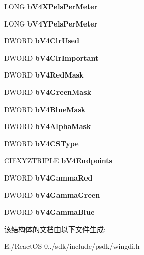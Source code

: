 \begin{DoxyCompactItemize}
L\+O\+NG {\bfseries b\+V4\+X\+Pels\+Per\+Meter}
\item 
\mbox{\label{struct_b_i_t_m_a_p_v4_h_e_a_d_e_r_a0fc6a8bfef13b3f5e3bb1db83ecb7c46}} 
L\+O\+NG {\bfseries b\+V4\+Y\+Pels\+Per\+Meter}
\item 
\mbox{\label{struct_b_i_t_m_a_p_v4_h_e_a_d_e_r_a67d48337562bfccf0e7bfad5e43259f5}} 
D\+W\+O\+RD {\bfseries b\+V4\+Clr\+Used}
\item 
\mbox{\label{struct_b_i_t_m_a_p_v4_h_e_a_d_e_r_a21566ebf9fc5970062c26f306de07291}} 
D\+W\+O\+RD {\bfseries b\+V4\+Clr\+Important}
\item 
\mbox{\label{struct_b_i_t_m_a_p_v4_h_e_a_d_e_r_abf265e26d79ff724cadb96afc1705c75}} 
D\+W\+O\+RD {\bfseries b\+V4\+Red\+Mask}
\item 
\mbox{\label{struct_b_i_t_m_a_p_v4_h_e_a_d_e_r_a565665e5c6929465d6bcddb801624435}} 
D\+W\+O\+RD {\bfseries b\+V4\+Green\+Mask}
\item 
\mbox{\label{struct_b_i_t_m_a_p_v4_h_e_a_d_e_r_aef5549b5b6d4a9cf64f2d9073148f6ff}} 
D\+W\+O\+RD {\bfseries b\+V4\+Blue\+Mask}
\item 
\mbox{\label{struct_b_i_t_m_a_p_v4_h_e_a_d_e_r_a83b08e6edd1fffae8c578bcfe5aedb16}} 
D\+W\+O\+RD {\bfseries b\+V4\+Alpha\+Mask}
\item 
\mbox{\label{struct_b_i_t_m_a_p_v4_h_e_a_d_e_r_a6e6b4e0b479b4a93862dd42e21c3534e}} 
D\+W\+O\+RD {\bfseries b\+V4\+C\+S\+Type}
\item 
\mbox{\label{struct_b_i_t_m_a_p_v4_h_e_a_d_e_r_a7d96ab939a15eb44cd3bdab7f242a97a}} 
\hyperlink{structtag_c_i_e_x_y_z_t_r_i_p_l_e}{C\+I\+E\+X\+Y\+Z\+T\+R\+I\+P\+LE} {\bfseries b\+V4\+Endpoints}
\item 
\mbox{\label{struct_b_i_t_m_a_p_v4_h_e_a_d_e_r_aa49b496cff8bf5e560278e6a13166e51}} 
D\+W\+O\+RD {\bfseries b\+V4\+Gamma\+Red}
\item 
\mbox{\label{struct_b_i_t_m_a_p_v4_h_e_a_d_e_r_aa22a4368c76603b528305533d28441e9}} 
D\+W\+O\+RD {\bfseries b\+V4\+Gamma\+Green}
\item 
\mbox{\label{struct_b_i_t_m_a_p_v4_h_e_a_d_e_r_a2c27b140317d38d2d9d4352e7c1985a7}} 
D\+W\+O\+RD {\bfseries b\+V4\+Gamma\+Blue}
\end{DoxyCompactItemize}


该结构体的文档由以下文件生成\+:\begin{DoxyCompactItemize}
\item 
E\+:/\+React\+O\+S-\/0../sdk/include/psdk/wingdi.\+h\end{DoxyCompactItemize}
